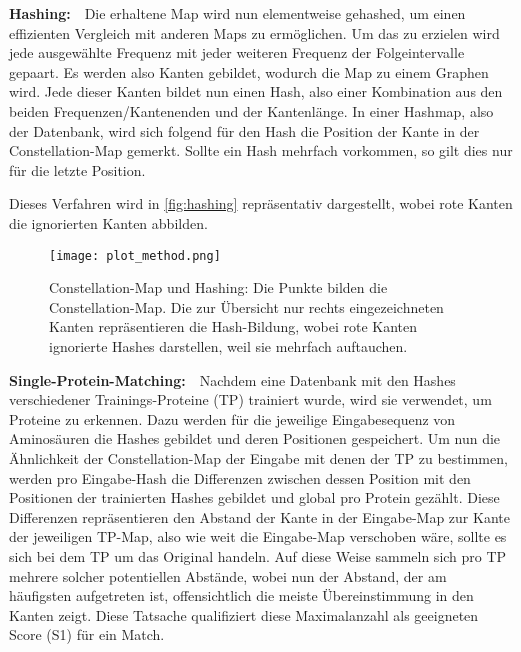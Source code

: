         \vspace{2.25mm}
        \textbf{Hashing:}\ \ Die erhaltene Map wird nun elementweise gehashed, um einen effizienten Vergleich mit anderen Maps zu ermöglichen. Um das zu erzielen wird jede ausgewählte Frequenz mit jeder weiteren Frequenz der Folgeintervalle gepaart. Es werden also Kanten gebildet, wodurch die Map zu einem Graphen wird. Jede dieser Kanten bildet nun einen Hash, also einer Kombination aus den beiden Frequenzen/Kantenenden und der Kantenlänge. In einer Hashmap, also der Datenbank, wird sich folgend für den Hash die Position der Kante in der Constellation-Map gemerkt. Sollte ein Hash mehrfach vorkommen, so gilt dies nur für die letzte Position.

        Dieses Verfahren wird in \autoref{fig:hashing} repräsentativ dargestellt, wobei rote Kanten die ignorierten Kanten abbilden.
        \begin{figure}[h]
            \texttt{[image: plot\_method.png]}
            \caption{Constellation-Map und Hashing: Die Punkte bilden die Constellation-Map. Die zur Übersicht nur rechts eingezeichneten Kanten repräsentieren die Hash-Bildung, wobei rote Kanten ignorierte Hashes darstellen, weil sie mehrfach auftauchen.}
            \label{fig:hashing}
        \end{figure}

        \vspace{2.25mm}
        \textbf{Single-Protein-Matching:}\ \ Nachdem eine Datenbank mit den Hashes verschiedener Trainings-Proteine (TP) trainiert wurde, wird sie verwendet, um Proteine zu erkennen. Dazu werden für die jeweilige Eingabesequenz von Aminosäuren die Hashes gebildet und deren Positionen gespeichert. Um nun die Ähnlichkeit der Constellation-Map der Eingabe mit denen der TP zu bestimmen, werden pro Eingabe-Hash die Differenzen zwischen dessen Position mit den Positionen der trainierten Hashes gebildet und global pro Protein gezählt. Diese Differenzen repräsentieren den Abstand der Kante in der Eingabe-Map zur Kante der jeweiligen TP-Map, also wie weit die Eingabe-Map verschoben wäre, sollte es sich bei dem TP um das Original handeln. Auf diese Weise sammeln sich pro TP mehrere solcher potentiellen Abstände, wobei nun der Abstand, der am häufigsten aufgetreten ist, offensichtlich die meiste Übereinstimmung in den Kanten zeigt. Diese Tatsache qualifiziert diese Maximalanzahl als geeigneten Score (S1) für ein Match.

